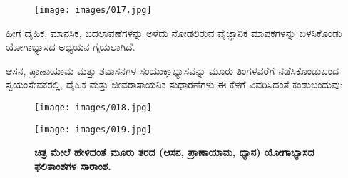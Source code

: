 \begin{figure}
\texttt{[image: images/017.jpg]}
\end{figure}

ಹೀಗೆ ದೈಹಿಕ, ಮಾನಸಿಕ,  ಬದಲಾವಣೆಗಳನ್ನು ಅಳೆದು ನೋಡಲಿರುವ ವೈಜ್ಞಾನಿಕ ಮಾಪಕಗಳನ್ನು ಬಳಸಿಕೊಂಡು ಯೋಗಾಭ್ಯಾಸದ ಅಧ್ಯಯನ ಗೈಯಲಾಗಿದೆ.

ಆಸನ, ಪ್ರಾಣಾಯಾಮ ಮತ್ತು ಶವಾಸನಗಳ ಸಂಯುಕ್ತಾಭ್ಯಾಸವನ್ನು ಮೂರು ತಿಂಗಳವರೆಗೆ ನಡೆಸಿಕೊಂಡುಬಂದ ಸ್ವಯಂಸೇವಕರಲ್ಲಿ, ದೈಹಿಕ ಮತ್ತು ಜೀವರಾಸಾಯನಿಕ ಸುಧಾರಣೆಗಳು ಈ ಕೆಳಗೆ ವಿವರಿಸಿದಂತೆ ಕಂಡುಬಂದುವು:

\begin{center}
\end{center}


\begin{figure}
\texttt{[image: images/018.jpg]}
\end{figure}


\begin{figure}
\texttt{[image: images/019.jpg]}
\caption{\textbf{ಚಿತ್ರ  ಮೇಲೆ ಹೇಳಿದಂತೆ ಮೂರು ತರದ (ಆಸನ, ಪ್ರಾಣಾಯಾಮ, ಧ್ಯಾನ) ಯೋಗಾಭ್ಯಾಸದ ಫಲಿತಾಂಶಗಳ ಸಾರಾಂಶ.} }
\end{figure}


